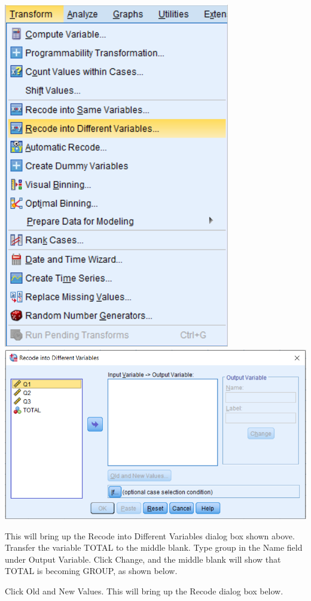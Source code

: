 \documentclass[
]{book}
\begin{document}
\includegraphics{Recode1.png}
\includegraphics{Recode2.png}

This will bring up the Recode into Different Variables dialog box shown above. Transfer the variable TOTAL to the middle blank. Type group in the Name field under Output Variable. Click Change, and the middle blank will show that TOTAL is becoming GROUP, as shown below.

Click Old and New Values. This will bring up the Recode dialog box below.
\end{document}
